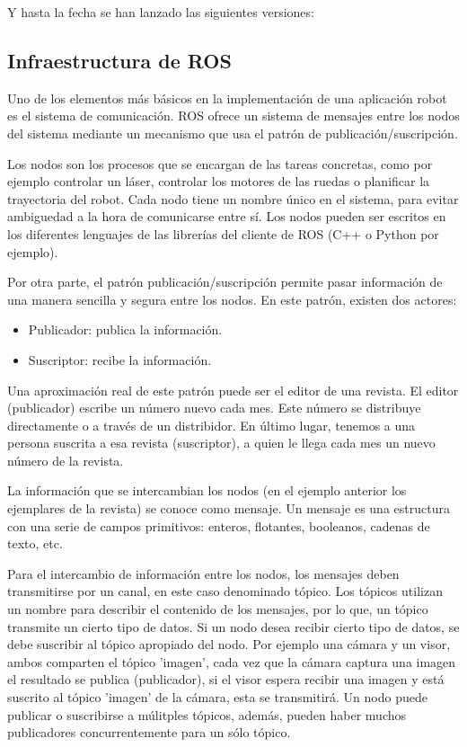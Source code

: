 Y hasta la fecha se han lanzado las siguientes versiones:



\subsection{Infraestructura de ROS}
Uno de los elementos más básicos en la implementación de una aplicación robot es
el sistema de comunicación. ROS ofrece un sistema de mensajes entre los nodos
del sistema mediante un mecanismo que usa el patrón de publicación/suscripción.

Los nodos son los procesos que se encargan de las tareas concretas, como por
ejemplo controlar un láser, controlar los motores de las ruedas o planificar la
trayectoria del robot. Cada nodo tiene un nombre único en el sistema, para
evitar ambiguedad a la hora de comunicarse entre sí. Los nodos pueden ser
escritos en los diferentes lenguajes de las librerías del cliente de ROS (C++ o
Python por ejemplo). 

Por otra parte, el patrón publicación/suscripción permite pasar información de
una manera sencilla y segura entre los nodos. En este patrón, existen dos
actores:

\begin{itemize}
  \item Publicador: publica la información.
  \item Suscriptor: recibe la información.
\end{itemize}

Una aproximación real de este patrón puede ser el editor de una revista. El
editor (publicador) escribe un número nuevo cada mes. Este número se distribuye
directamente o a través de un distribidor. En último lugar, tenemos a una
persona suscrita a esa revista (suscriptor), a quien le llega cada mes un nuevo
número de la revista.

La información que se intercambian los nodos (en el ejemplo anterior los
ejemplares de la revista) se conoce como mensaje. Un mensaje es una estructura
con una serie de campos primitivos: enteros, flotantes, booleanos, cadenas de
texto, etc.

Para el intercambio de información entre los nodos, los mensajes deben
transmitirse por un canal, en este caso denominado tópico. Los tópicos utilizan
un nombre para describir el contenido de los mensajes, por lo que, un tópico
transmite un cierto tipo de datos. Si un nodo desea recibir cierto tipo de
datos, se debe suscribir al tópico apropiado del nodo. Por ejemplo una cámara y
un visor, ambos comparten el tópico 'imagen', cada vez que la cámara captura una
imagen el resultado se publica (publicador), si el visor espera recibir una
imagen y está suscrito al tópico 'imagen' de la cámara, esta se transmitirá. Un
nodo puede publicar o suscribirse a múlitples tópicos, además, pueden haber
muchos publicadores concurrentemente para un sólo tópico.


